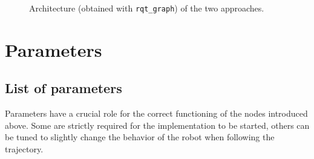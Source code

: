 \documentclass[11pt,a4paper]{article}
\begin{document}
\begin{figure}[H]
    \centering
    \quad
    \caption[]{Architecture (obtained with \texttt{rqt\_graph}) of the two approaches.}
\end{figure}





\section{Parameters}



\subsection{List of parameters}

Parameters have a crucial role for the correct functioning of the nodes introduced above.
Some are strictly required for the implementation to be started, others can be tuned to slightly
change the behavior of the robot when following the trajectory.\\
\end{document}
